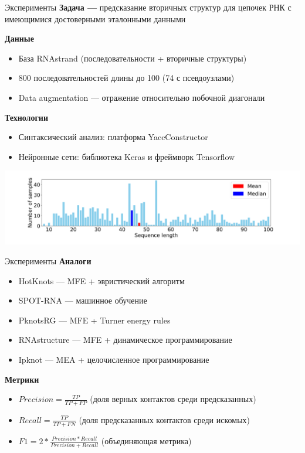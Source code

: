 \documentclass{beamer}
\begin{document}
\begin{frame}{Эксперименты}
\textbf{Задача --- } предсказание вторичных структур для цепочек РНК с имеющимися достоверными эталонными данными 

\vspace{3mm}

\textbf{Данные}
\begin{itemize}
    \item База RNAstrand (последовательности + вторичные структуры)
    \item 800 последовательностей длины до 100 (74 с псевдоузлами)
    \item Data augmentation --- отражение относительно побочной диагонали
\end{itemize}

\vspace{3mm}

\textbf{Технологии}
\begin{itemize}
    \item Синтаксический анализ: платформа YaccConstructor
    \item Нейронные сети: библиотека Keras и фреймворк Tensorflow 
\end{itemize}

\vspace{3mm}

\centering
\includegraphics[width=\textwidth]{pics/plot_distr.png}
\end{frame}

\begin{frame}{Эксперименты}
\textbf{Аналоги}
\begin{itemize}
    \item HotKnots --- MFE + эвристический алгоритм 
    \item SPOT-RNA --- машинное обучение
    \item PknotsRG --- MFE + Turner energy rules 
    \item RNAstructure --- MFE + динамическое программирование 
    \item Ipknot --- MEA + целочисленное программирование
 \end{itemize} 

\vspace{6mm}

\textbf{Метрики}
\begin{itemize}
    \item $Precision = \frac{TP}{TP + FP}$ (доля верных контактов среди предсказанных)
    \item $Recall = \frac{TP}{TP + FN}$ (доля предсказанных контактов среди искомых)
    \item $F1 = 2*\frac{Precision * Recall}{Precision + Recall}$ (объединяющая метрика)
\end{itemize}
\end{frame}
\end{document}
